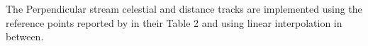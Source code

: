 The Perpendicular stream celestial and distance tracks are implemented using the reference points reported by \citet{Weiss2018} in their Table 2 and using linear interpolation in between.
